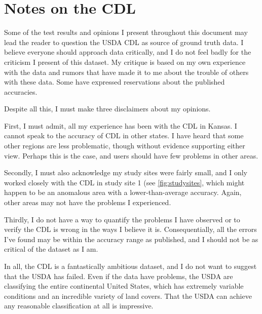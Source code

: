 \chapter{Notes on the CDL}
\label{appendix:cdl}

Some of the test results and opinions I present throughout this document may lead the reader to question the USDA CDL as source of ground truth data. I believe everyone should approach data critically, and I do not feel badly for the criticism I present of this dataset. My critique is based on my own experience with the data and rumors that have made it to me about the trouble of others with these data. Some have expressed reservations about the published accuracies.


Despite all this, I must make three disclaimers about my opinions.

First, I must admit, all my experience has been with the CDL in Kansas. I cannot speak to the accuracy of CDL in other states. I have heard that some other regions are less problematic, though without evidence supporting either view. Perhaps this is the case, and users should have few problems in other areas.

Secondly, I must also acknowledge my study sites were fairly small, and I only worked closely with the CDL in study site 1 (see \cref{fig:studysites}, which might happen to be an anomalous area with a lower-than-average accuracy. Again, other areas may not have the problems I experienced.

Thirdly, I do not have a way to quantify the problems I have observed or to verify the CDL is wrong in the ways I believe it is. Consequentially, all the errors I've found may be within the accuracy range as published, and I should not be as critical of the dataset as I am.

In all, the CDL is a fantastically ambitious dataset, and I do not want to suggest that the USDA has failed. Even if the data have problems, the USDA are classifying the entire continental United States, which has extremely variable conditions and an incredible variety of land covers. That the USDA can achieve any reasonable classification at all is impressive.